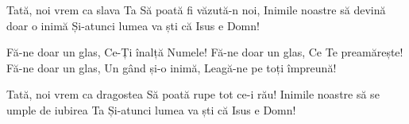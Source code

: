 \beginverse
Tată, noi vrem ca slava Ta
Să poată fi văzută-n noi,
Inimile noastre să devină doar o inimă
Și-atunci lumea va ști că Isus e Domn!
\endverse

\beginchorus
Fă-ne doar un glas,
Ce-Ți înalță Numele!
Fă-ne doar un glas,
Ce Te preamărește!
Fă-ne doar un glas,
Un gând și-o inimă,
Leagă-ne pe toți împreună!
\endchorus

\beginverse
Tată, noi vrem ca dragostea
Să poată rupe tot ce-i rău!
Inimile noastre să se umple de iubirea Ta
Și-atunci lumea va ști că Isus e Domn!
\endverse
\endsong